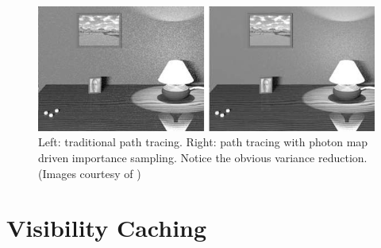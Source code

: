 \documentclass[]{book}
\begin{document}
\begin{figure}[b]
	\centering
	\includegraphics[width=4.5in]{img/PM-importance.png}
	\caption[Photon Driven Importance Sampling]{Left: traditional path tracing. Right: path tracing with photon map driven importance sampling. Notice the obvious variance reduction. (Images courtesy of \citeauthor{jensen1995importance})}
	\label{fig:PM:importance}
\end{figure}


\chapter{Visibility Caching}
\label{chap:vis_cache}
\end{document}
